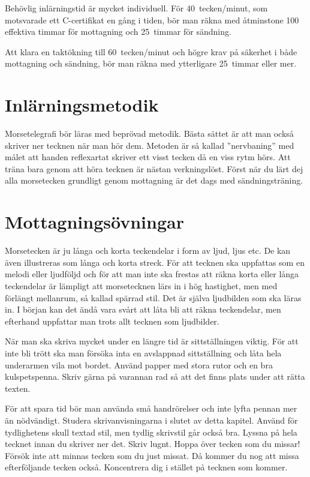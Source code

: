 Behövlig inlärningstid är mycket individuell.
För 40~tecken/minut, som motsvarade ett C-certifikat en gång i tiden, bör man
räkna med åtminstone 100 effektiva timmar för mottagning och 25~timmar för
sändning.

Att klara en taktökning till 60~tecken/minut och högre krav på säkerhet i både
mottagning och sändning, bör man räkna med ytterligare 25~timmar eller mer.

\section{Inlärningsmetodik}

Morsetelegrafi bör läras med beprövad metodik.
Bästa sättet är att man också skriver ner tecknen när man hör dem.
Metoden är så kallad ''nervbaning'' med målet att handen reflexartat skriver
ett visst tecken då en viss rytm hörs.
Att träna bara genom att höra tecknen är nästan verkningslöst.
Först när du lärt dej alla morsetecken grundligt genom mottagning är det dags
med sändningsträning.

\section{Mottagnings\-övningar}

Morsetecken är ju långa och korta teckendelar i form av ljud, ljus etc.
De kan även illustreras som långa och korta streck.
För att tecknen ska uppfattas som en melodi eller ljudföljd och för att man
inte ska frestas att räkna korta eller långa teckendelar är lämpligt att
morsetecknen lärs in i hög hastighet, men med förlängt mellanrum, så kallad
spärrad stil.
Det är själva ljudbilden som ska läras in.
I början kan det ändå vara svårt att låta bli att räkna teckendelar, men
efterhand uppfattar man trots allt tecknen som ljudbilder.

När man ska skriva mycket under en längre tid är sittställningen viktig.
För att inte bli trött ska man försöka inta en avslappnad sittställning och låta
hela underarmen vila mot bordet.
Använd papper med stora rutor och en bra kulspetspenna.
Skriv gärna på varannan rad så att det finns plats under att rätta texten.

För att spara tid bör man använda små handrörelser och inte lyfta pennan mer än
nödvändigt.
Studera skrivanvisningarna i slutet av detta kapitel.
Använd för tydlighetens skull textad stil, men tydlig skrivstil går också bra.
Lyssna på hela tecknet innan du skriver ner det.
Skriv lugnt.
Hoppa över tecken som du missar!
Försök inte att minnas tecken som du just missat.
Då kommer du nog att missa efterföljande tecken också.
Koncentrera dig i stället på tecknen som kommer.

